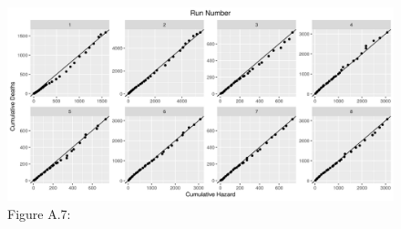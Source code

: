 \documentclass[
]{article}
\begin{document}
\begin{figure}
\centering
\includegraphics{../Plots/Survival/redlinpred_Cumulative_haz-death_age.png}
\caption{Figure A.7:}
\end{figure}
\end{document}
